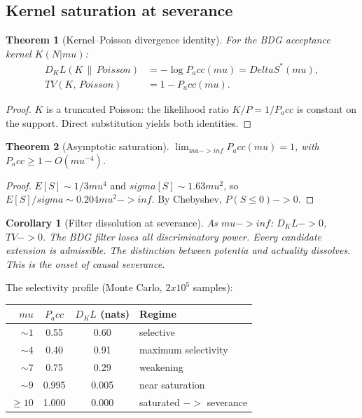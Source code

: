 \documentclass[11pt]{article}
\def\Delta{Delta}%
\def\sigma{sigma}%
\def\mu{mu}%
\def\mathrm#1{#1}%
\def\mathbf#1{#1}%
\def\mathbb#1{#1}%
\def\frac#1#2{#1/#2}%
\def\times{x}%
\def\to{->}%
\def\infty{inf}%
\def\Pacc{P_acc}%
\def\Dkl{D_KL}%
\def\TV{TV}%
\newtheorem{theorem}{Theorem}
\newtheorem{corollary}{Corollary}
\newcommand{\Pacc}{P_{\mathrm{acc}}}
\newcommand{\Dkl}{D_{\mathrm{KL}}}
\newcommand{\TV}{\mathrm{TV}}
\begin{document}
\subsection{Kernel saturation at severance}

\begin{theorem}[Kernel--Poisson divergence identity]
\label{thm:kl}
For the BDG acceptance kernel $K(\mathbf{N}|\mu)$:
\begin{align}
\Dkl(K\,\|\,\mathrm{Poisson}) &= -\log\Pacc(\mu) = \Delta S^*(\mu), \\
\TV(K,\,\mathrm{Poisson}) &= 1-\Pacc(\mu).
\end{align}
\end{theorem}
\begin{proof}
$K$ is a truncated Poisson: the likelihood ratio $K/P=1/\Pacc$ is constant on the support. Direct substitution yields both identities.
\end{proof}

\begin{theorem}[Asymptotic saturation]
\label{thm:saturation}
$\lim_{\mu\to\infty}\Pacc(\mu)=1$, with $\Pacc\ge 1-O(\mu^{-4})$.
\end{theorem}
\begin{proof}
$\mathbb{E}[S]\sim\frac{1}{3}\mu^4$ and $\sigma[S]\sim 1.63\mu^2$, so $\mathbb{E}[S]/\sigma\sim 0.204\mu^2\to\infty$. By Chebyshev, $\mathbb{P}(S\le 0)\to 0$.
\end{proof}

\begin{corollary}[Filter dissolution at severance]
As $\mu\to\infty$: $\Dkl\to 0$, $\TV\to 0$. The BDG filter loses all discriminatory power. Every candidate extension is admissible. The distinction between potentia and actuality dissolves. This is the onset of causal severance.
\end{corollary}

The selectivity profile (Monte Carlo, $2\times 10^5$ samples):

\begin{center}
\begin{tabular}{rccl}
\toprule
$\mu$ & $\Pacc$ & $\Dkl$ (nats) & Regime \\
\midrule
$\sim 1$ & 0.55 & 0.60 & selective \\
$\sim 4$ & 0.40 & 0.91 & maximum selectivity \\
$\sim 7$ & 0.75 & 0.29 & weakening \\
$\sim 9$ & 0.995 & 0.005 & near saturation \\
$\ge 10$ & 1.000 & 0.000 & saturated $\to$ severance \\
\bottomrule
\end{tabular}
\end{center}
\end{document}
